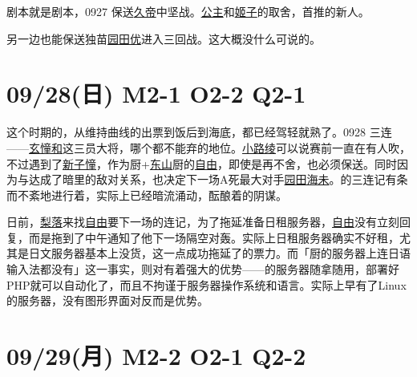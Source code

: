 剧本就是剧本，0927 保送\uline{久帝}中坚战。\uline{公主}和\uline{姬子}的取舍，首推的新人。

另一边也能保送独苗\uline{园田优}进入三回战。这大概没什么可说的。

\section{09/28(日) M2-1 O2-2 Q2-1}


这个时期的，从维持曲线的出票到饭后到海底，都已经驾轻就熟了。0928 三连——\uline{玄憧和}这三员大将，哪个都不能弃的地位。\uline{小路绫}可以说赛前一直在有人吹，不过遇到了\uline{新子憧}，作为厨+\uline{东山}厨的\uline{自由}，即使是再不舍，也必须保送。同时因为与达成了暗里的敌对关系，也决定下一场A死最大对手\uline{园田海未}。的三连记有条而不紊地进行着，实际上已经暗流涌动，酝酿着的阴谋。

日前，\uline{梨落}来找\uline{自由}要下一场的连记，为了拖延准备日租服务器，\uline{自由}没有立刻回复，而是拖到了中午通知了他下一场隔空对轰。实际上日租服务器确实不好租，尤其是日文服务器基本上没货，这一点成功拖延了的票力。而「厨的服务器上连日语输入法都没有」这一事实，则对有着强大的优势——的服务器随拿随用，部署好PHP就可以自动化了，而且不拘谨于服务器操作系统和语言。实际上早有了Linux的服务器，没有图形界面对反而是优势。

\section{09/29(月) M2-2 O2-1 Q2-2}


